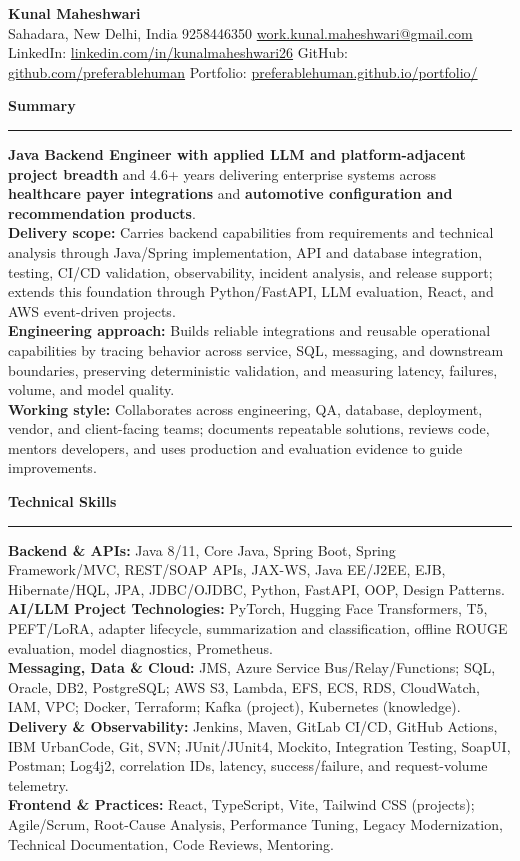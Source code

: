 \documentclass[11pt,letterpaper]{article}
\newcommand{\ressection}[1]{\Needspace{6\baselineskip}\vspace{8pt}\par\textbf{#1}\par\vspace{2pt}\hrule\vspace{5pt}}
\begin{document}
\pagestyle{empty}\raggedright\fontsize{11}{12.5}\selectfont

{\Large \textbf{Kunal Maheshwari}}\\
Sahadara, New Delhi, India \textbar{} 9258446350 \textbar{} \href{mailto:work.kunal.maheshwari@gmail.com}{work.kunal.maheshwari@gmail.com}\\
LinkedIn: \href{https://www.linkedin.com/in/kunalmaheshwari26}{linkedin.com/in/kunalmaheshwari26} \textbar{} GitHub: \href{https://github.com/preferablehuman}{github.com/preferablehuman} \textbar{} Portfolio: \href{https://preferablehuman.github.io/portfolio/}{preferablehuman.github.io/portfolio/}

\ressection{Summary}
\textbf{Java Backend Engineer with applied LLM and platform-adjacent project breadth} and 4.6+ years delivering enterprise systems across \textbf{healthcare payer integrations} and \textbf{automotive configuration and recommendation products}.\\[2pt]
\textbf{Delivery scope:} Carries backend capabilities from requirements and technical analysis through Java/Spring implementation, API and database integration, testing, CI/CD validation, observability, incident analysis, and release support; extends this foundation through Python/FastAPI, LLM evaluation, React, and AWS event-driven projects.\\[2pt]
\textbf{Engineering approach:} Builds reliable integrations and reusable operational capabilities by tracing behavior across service, SQL, messaging, and downstream boundaries, preserving deterministic validation, and measuring latency, failures, volume, and model quality.\\[2pt]
\textbf{Working style:} Collaborates across engineering, QA, database, deployment, vendor, and client-facing teams; documents repeatable solutions, reviews code, mentors developers, and uses production and evaluation evidence to guide improvements.

\ressection{Technical Skills}
\textbf{Backend \& APIs:} Java 8/11, Core Java, Spring Boot, Spring Framework/MVC, REST/SOAP APIs, JAX-WS, Java EE/J2EE, EJB, Hibernate/HQL, JPA, JDBC/OJDBC, Python, FastAPI, OOP, Design Patterns.\\
\textbf{AI/LLM Project Technologies:} PyTorch, Hugging Face Transformers, T5, PEFT/LoRA, adapter lifecycle, summarization and classification, offline ROUGE evaluation, model diagnostics, Prometheus.\\
\textbf{Messaging, Data \& Cloud:} JMS, Azure Service Bus/Relay/Functions; SQL, Oracle, DB2, PostgreSQL; AWS S3, Lambda, EFS, ECS, RDS, CloudWatch, IAM, VPC; Docker, Terraform; Kafka (project), Kubernetes (knowledge).\\
\textbf{Delivery \& Observability:} Jenkins, Maven, GitLab CI/CD, GitHub Actions, IBM UrbanCode, Git, SVN; JUnit/JUnit4, Mockito, Integration Testing, SoapUI, Postman; Log4j2, correlation IDs, latency, success/failure, and request-volume telemetry.\\
\textbf{Frontend \& Practices:} React, TypeScript, Vite, Tailwind CSS (projects); Agile/Scrum, Root-Cause Analysis, Performance Tuning, Legacy Modernization, Technical Documentation, Code Reviews, Mentoring.
\end{document}
